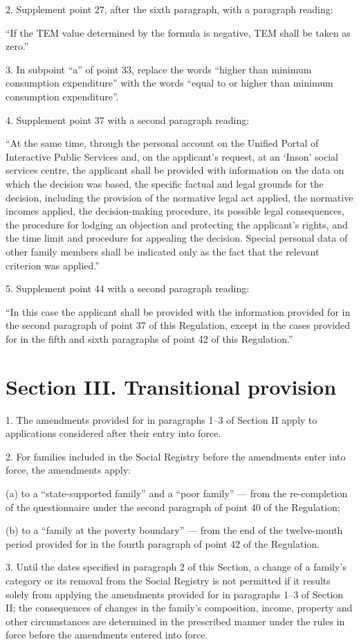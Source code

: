 \documentclass[14pt,a4paper]{extarticle}
\newcommand{\norm}[1]{\par\noindent\hspace*{1.27cm}#1. }
\newcommand{\sub}[1]{\par\noindent\hspace*{1.27cm}#1 }
\begin{document}
\norm{2}Supplement point 27, after the sixth paragraph, with a paragraph reading:

“If the TEM value determined by the formula is negative, TEM shall be taken as zero.”

\norm{3}In subpoint “a” of point 33, replace the words “higher than minimum consumption expenditure” with the words “equal to or higher than minimum consumption expenditure”.

\norm{4}Supplement point 37 with a second paragraph reading:

“At the same time, through the personal account on the Unified Portal of Interactive Public Services and, on the applicant’s request, at an ‘Inson’ social services centre, the applicant shall be provided with information on the data on which the decision was based, the specific factual and legal grounds for the decision, including the provision of the normative legal act applied, the normative incomes applied, the decision-making procedure, its possible legal consequences, the procedure for lodging an objection and protecting the applicant’s rights, and the time limit and procedure for appealing the decision. Special personal data of other family members shall be indicated only as the fact that the relevant criterion was applied.”

\norm{5}Supplement point 44 with a second paragraph reading:

“In this case the applicant shall be provided with the information provided for in the second paragraph of point 37 of this Regulation, except in the cases provided for in the fifth and sixth paragraphs of point 42 of this Regulation.”
\section*{Section III. Transitional provision}

\norm{1}The amendments provided for in paragraphs 1–3 of Section II apply to applications considered after their entry into force.

\norm{2}For families included in the Social Registry before the amendments enter into force, the amendments apply:
\sub{(a)}to a “state-supported family” and a “poor family” — from the re-completion of the questionnaire under the second paragraph of point 40 of the Regulation;
\sub{(b)}to a “family at the poverty boundary” — from the end of the twelve-month period provided for in the fourth paragraph of point 42 of the Regulation.

\norm{3}Until the dates specified in paragraph 2 of this Section, a change of a family’s category or its removal from the Social Registry is not permitted if it results solely from applying the amendments provided for in paragraphs 1–3 of Section II; the consequences of changes in the family’s composition, income, property and other circumstances are determined in the prescribed manner under the rules in force before the amendments entered into force.
\end{document}
